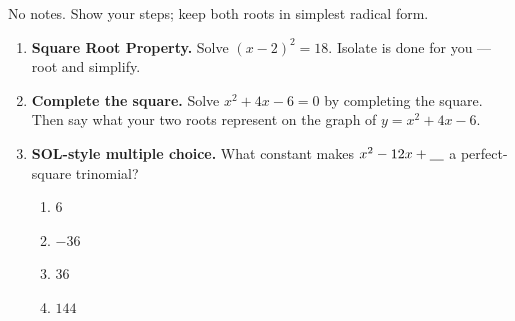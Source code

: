 \documentclass[10pt]{article}
\begin{document}

\vspace{0.12in}

No notes. Show your steps; keep both roots in simplest radical form.

\begin{enumerate}[leftmargin=1.8em, itemsep=12pt]
  \item \textbf{Square Root Property.} Solve $(x-2)^2=18$. Isolate is done for you --- root and simplify.
  \item \textbf{Complete the square.} Solve $x^2+4x-6=0$ by completing the square. Then say what your two
        roots represent on the graph of $y=x^2+4x-6$.
  \item \textbf{SOL-style multiple choice.} What constant makes $x^2-12x+\underline{\hphantom{00}}$ a
        perfect-square trinomial?
        \begin{enumerate}[label=\Alph*., leftmargin=1.9em, itemsep=1pt]
          \item $6$
          \item $-36$
          \item $36$
          \item $144$
        \end{enumerate}
\end{enumerate}
\end{document}
